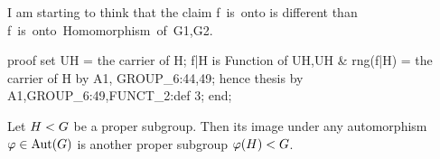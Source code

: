 \begin{thm-remark}
I am starting to think that the claim {\Tt{}f\ is\ onto\nwendquote} is different than
{\Tt{}f\ is\ onto\ Homomorphism\ of\ G1,G2\nwendquote}.
\end{thm-remark}

\nwenddocs{}\endmoddef\nwstartdeflinemarkup\nwenddeflinemarkup
proof
  set UH = the carrier of H;
  f|H is Function of UH,UH & rng(f|H) = the carrier of H by A1, GROUP_6:44,49;
  hence thesis by A1,GROUP_6:49,FUNCT_2:def 3;
end;
\nwendcode{}\nwdocspar

\begin{theorem}
Let $H< G$ be a proper subgroup. Then its image under any
automorphism $\varphi\in\operatorname{Aut}(G)$ is another proper subgroup
$\varphi(H)< G$.
\end{theorem}

